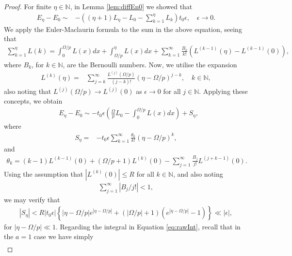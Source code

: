 \documentclass[reqno,a4paper]{amsart}
\numberwithin{equation}{section}
\theoremstyle{plain}
\theoremstyle{remark}
\begin{document}
\begin{proof}
    For finite $\eta\in\mathbb{N}$, in Lemma \ref{lem:diffEn0} we showed that
    \begin{align*}
        E_\eta-E_{0}\sim&-\left((\eta+1)L_\eta-L_0-\sum_{k=1}^{\eta}L_k\right)t_0\epsilon,\quad\epsilon\to0.
    \end{align*}
    We apply the Euler-Maclaurin formula to the sum in the above equation, seeing that
    \begin{align*}
        \sum_{k=1}^{\eta}L(k)=\int_{0}^{\Omega/p}L(x)dx+\int_{\Omega/p}^{\eta}L(x)dx+\sum_{k=1}^{\infty}\frac{B_k}{k!}\left(L^{(k-1)}(\eta)-L^{(k-1)}(0)\right),
    \end{align*}
    where $B_k$, for $k\in\mathbb{N}$, are the Bernoulli numbers. Now, we utilise the expansion
    \begin{align*}
        L^{(k)}(\eta)=&\sum_{j=k}^{\infty}\frac{L^{(j)}(\Omega/p)}{(j-k)!}(\eta-\Omega/p)^{j-k},\quad k\in\mathbb{N},
    \end{align*}
    also noting that $L^{(j)}(\Omega/p)\to L^{(j)}(0)$ as $\epsilon\to0$ for all $j\in\mathbb{N}$. Applying these concepts, we obtain
    \begin{align}\label{eq:rawInt}
        &E_\eta-E_{0}\sim-t_0\epsilon\left(\frac{\Omega}{p}L_0-\int_{0}^{\Omega/p}L(x)dx\right)+S_\eta,
    \end{align}
    where
    \begin{align*}
        S_\eta=&-t_0\epsilon\sum_{k=1}^{\infty}\frac{\theta_k}{k!}(\eta-\Omega/p)^{k},
    \end{align*}
    and
    \begin{align*}
        \theta_k=(k-1)L^{(k-1)}(0)+\left(\Omega/p+1\right)L^{(k)}(0)-\sum_{j=1}^{\infty}\frac{B_j}{j!}L^{(j+k-1)}(0).
    \end{align*}
    Using the assumption that $|L^{(k)}(0)|\leq R$ for all $k\in\mathbb{N}$, and also noting
    \begin{align*}
        \sum_{j=1}^{\infty}|B_j/j!|<1,
    \end{align*}
    we may verify that
    \begin{align*}
        |S_\eta|<R|t_0\epsilon|\left\{|\eta-\Omega/p|e^{|\eta-\Omega/p|}+\left(\left|\Omega/p\right|+1\right)\left(e^{|\eta-\Omega/p|}-1\right)\right\}\ll|\epsilon|,
    \end{align*}
    for $|\eta-\Omega/p|\ll1$. Regarding the integral in Equation \eqref{eq:rawInt}, recall that in the $a=1$ case we have simply
    \begin{align*}

\end{align*}
\end{proof}
\end{document}
